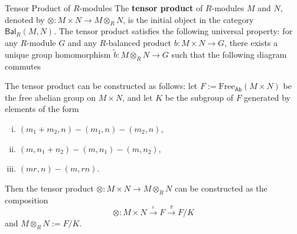 \begin{definition}{Tensor Product of $R$-modules}{}
    The \textbf{tensor product} of $R$-modules $M$ and $N$, denoted by $\otimes :M\times N\to M\otimes_R N$, is the initial object in the category $\mathsf{Bal}_R(M, N)$. The tensor product satisfies the following universal property: for any $R$-module $G$ and any $R$-balanced product $b:M\times N\to G$, there exists a unique group homomorphism $\widetilde{b}:M\otimes_R N\to G$ such that the following diagram commutes
    \begin{center}
    \end{center}
    The tensor product can be constructed as follows: let $F:=\mathrm{Free}_{\mathsf{Ab}}(M\times N)$ be the free abelian group on $M\times N$, and let $K$ be the subgroup of $F$ generated by elements of the form
    \begin{enumerate}[(i)]
        \item $(m_1+m_2, n)-(m_1, n)-(m_2, n)$,
        \item $(m, n_1+n_2)-(m, n_1)-(m, n_2)$,
        \item $(mr, n)-(m, rn)$.
    \end{enumerate}
    Then the tensor product $\otimes :M\times N\to M\otimes_R N$ can be constructed as the composition
    \[
        \otimes :M\times N\xrightarrow{\iota}F \xrightarrow{\pi}F/K
    \]
    and $M\otimes_R N:=F/K$.
\end{definition}
